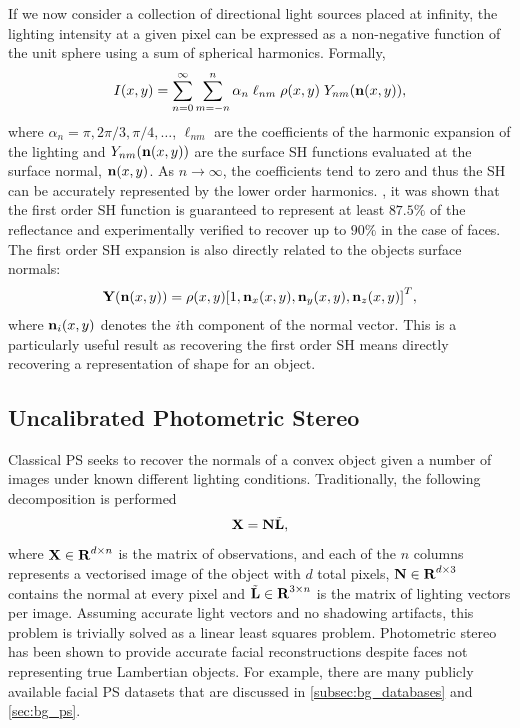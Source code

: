 If we now consider a collection of directional light sources placed at infinity,
the lighting intensity at a given pixel can be expressed as a non-negative
function of the unit sphere using a sum of spherical harmonics. Formally,
\begin{equation}\label{eq:spherical_harmonics}
    I(x, y) = \sum^{\infty}_{n=0} \sum^{n}_{m=-n} \alpha_n \; \ell_{nm} \; \rho(x,y) \; Y_{nm}(\boldsymbol{\mathbf{n}}(x,y)),
\end{equation}
where $\alpha_n = \pi, 2\pi/3, \pi/4, \ldots$, $\ell_{nm}$ are the coefficients
of the harmonic expansion of the lighting and $Y_{nm}(\boldsymbol{\mathbf{n}}(x,y))$ are the
surface SH functions evaluated at the surface normal, $\boldsymbol{\mathbf{n}}(x,y)$. As
$n \rightarrow \infty$, the coefficients tend to zero and thus the SH can be
accurately represented by the lower order harmonics. \citet{frolova2004accuracy}, it
was shown that the first order SH function is guaranteed to represent at least
$87.5\%$ of the reflectance and experimentally verified to recover up to $90\%$
in the case of faces. The first order SH expansion is also directly related to
the objects surface normals:
\begin{equation}\label{eq:first_order_spherical_harmonics}
    \begin{aligned}
        \boldsymbol{\mathbf{Y}}(\boldsymbol{\mathbf{n}}(x, y))  = \rho(x, y) {[ 1, \boldsymbol{\mathbf{n}}_{x}(x, y), \boldsymbol{\mathbf{n}}_{y}(x, y), \boldsymbol{\mathbf{n}}_{z}(x, y) ]}^T,
   \end{aligned}
\end{equation}
where $\boldsymbol{\mathbf{n}}_{i}(x, y)$ denotes the $i$th component of the normal vector.
This is a particularly useful result as recovering the first order SH means
directly recovering a representation of shape for an object.
\subsection{Uncalibrated Photometric Stereo}\label{subsec:imag_coll_uncalibrated_ps}
Classical PS seeks to recover the normals of a convex
object given a number of images under known different lighting conditions.
Traditionally, the following decomposition is performed
\begin{equation}\label{eq:general_ps}
    \boldsymbol{\mathbf{X}} = \boldsymbol{\mathbf{N}} \tilde{\boldsymbol{\mathbf{L}}},
\end{equation}
where $\boldsymbol{\mathbf{X}} \in \boldsymbol{\mathbf{R}}^{d \times n}$ is the matrix of observations,
and each of the $n$ columns represents a vectorised image of the object with $d$
total pixels, $\boldsymbol{\mathbf{N}} \in \boldsymbol{\mathbf{R}}^{d \times 3}$ contains the normal at
every pixel and $\tilde{\boldsymbol{\mathbf{L}}} \in \boldsymbol{\mathbf{R}}^{3 \times n}$ is the matrix
of lighting vectors per image. Assuming accurate light vectors and no shadowing
artifacts, this problem is trivially solved as a linear least squares problem.
Photometric stereo has been shown to provide accurate facial reconstructions
despite faces not representing true Lambertian objects. For example, there are
many publicly available facial PS datasets that are discussed in
\cref{subsec:bg_databases} and \cref{sec:bg_ps}.

